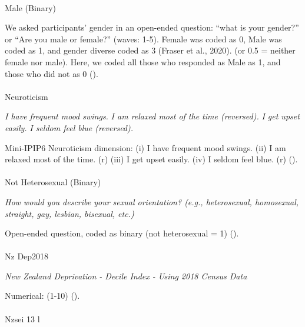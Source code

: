 \documentclass[
  single column]{article}
\makeatletter
\let\oldparagraph\paragraph
\renewcommand{\paragraph}{
    \@ifstar
      \xxxParagraphStar
      \xxxParagraphNoStar
  }
\newcommand{\xxxParagraphStar}[1]{\oldparagraph*{#1}\mbox{}}
\newcommand{\xxxParagraphNoStar}[1]{\oldparagraph{#1}\mbox{}}
\makeatother
\begin{document}
\paragraph{Male (Binary)}\label{male-binary}

We asked participants' gender in an open-ended question: ``what is your
gender?'' or ``Are you male or female?'' (waves: 1-5). Female was coded
as 0, Male was coded as 1, and gender diverse coded as 3 (Fraser et al.,
2020). (or 0.5 = neither female nor male). Here, we coded all those who
responded as Male as 1, and those who did not as 0
().

\paragraph{Neuroticism}\label{neuroticism}

\emph{I have frequent mood swings.} \emph{I am relaxed most of the time
(reversed).} \emph{I get upset easily.} \emph{I seldom feel blue
(reversed).}

Mini-IPIP6 Neuroticism dimension: (i) I have frequent mood swings. (ii)
I am relaxed most of the time. (r) (iii) I get upset easily. (iv) I
seldom feel blue. (r) ().

\paragraph{Not Heterosexual (Binary)}\label{not-heterosexual-binary}

\emph{How would you describe your sexual orientation? (e.g.,
heterosexual, homosexual, straight, gay, lesbian, bisexual, etc.)}

Open-ended question, coded as binary (not heterosexual = 1)
().

\paragraph{Nz Dep2018}\label{nz-dep2018}

\emph{New Zealand Deprivation - Decile Index - Using 2018 Census Data}

Numerical: (1-10) ().

\paragraph{Nzsei 13 l}\label{nzsei-13-l}
\end{document}
